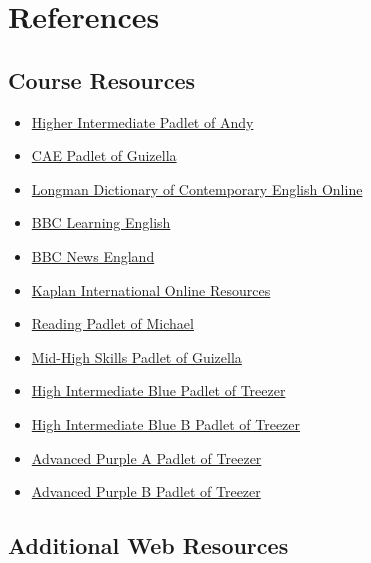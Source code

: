 \chapter{References}

\section{Course Resources}

\begin{itemize}
    \item \href{https://padlet.com/andyjonpowell/higher-intermediate-padlet-4hi8udqyht2gvija}{Higher Intermediate Padlet of Andy}
    \item \href{https://padlet.com/guizzelamatienzo/cae-starting-september-2025-26yqh4l39bsxml94}{CAE Padlet of Guizella}
    \item \href{https://www.ldoceonline.com/}{Longman Dictionary of Contemporary English Online}
    \item \href{https://www.bbc.co.uk/learningenglish}{BBC Learning English}
    \item \href{https://www.bbc.co.uk/news/england}{BBC News England}
    \item \href{https://online.kaplaninternational.com/}{Kaplan International Online Resources}
    \item \href{https://padlet.com/michaelllllll/reading-w9ctkjg8k1gkbwcx}{Reading Padlet of Michael}
    \item \href{https://padlet.com/guizzelamatienzo/elective-mid-high-skills-5h788380u6yos1yh}{Mid-High Skills Padlet of Guizella}
    \item \href{https://padlet.com/treezerchelimo1/high-int-blue-v5hmgx4vau799i2u}{High Intermediate Blue Padlet of Treezer}
    \item \href{https://padlet.com/treezerchelimo1/blue-b-pklkualbjkmsezjd}{High Intermediate Blue B Padlet of Treezer}
    \item \href{https://padlet.com/treezerchelimo1/purple-a-yi811hayp2xsz5sb}{Advanced Purple A Padlet of Treezer}
    \item \href{https://padlet.com/treezerchelimo1/purple-b-spu7i05s933gl4oe}{Advanced Purple B Padlet of Treezer}
\end{itemize}

\section{Additional Web Resources}

